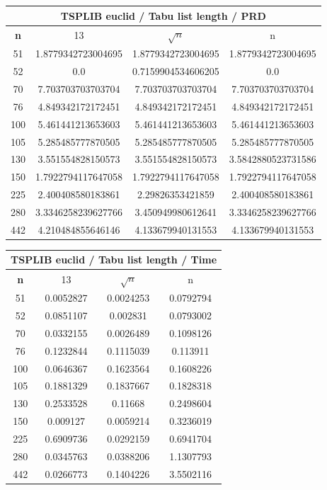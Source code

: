 \documentclass{article}
\begin{document}
\begin{center}
\begin{tabular}{|c|c|c|c|}
\hline
\multicolumn{4}{|c|}{\textbf{TSPLIB euclid / Tabu list length / PRD}}\\
\hline
\textbf{n} & 13 & $\sqrt{n}$ & n\\
\hline
51 & 1.8779342723004695 & 1.8779342723004695 & 1.8779342723004695\\
\hline
52 & 0.0 & 0.7159904534606205 & 0.0\\
\hline
70 & 7.703703703703704 & 7.703703703703704 & 7.703703703703704\\
\hline
76 & 4.849342172172451 & 4.849342172172451 & 4.849342172172451\\
\hline
100 & 5.461441213653603 & 5.461441213653603 & 5.461441213653603\\
\hline
105 & 5.285485777870505 & 5.285485777870505 & 5.285485777870505\\
\hline
130 & 3.551554828150573 & 3.551554828150573 & 3.5842880523731586\\
\hline
150 & 1.7922794117647058 & 1.7922794117647058 & 1.7922794117647058\\
\hline
225 & 2.400408580183861 & 2.29826353421859 & 2.400408580183861\\
\hline
280 & 3.3346258239627766 & 3.450949980612641 & 3.3346258239627766\\
\hline
442 & 4.210484855646146 & 4.133679940131553 & 4.133679940131553\\
\hline
\end{tabular}
\end{center}


\begin{center}
\begin{tabular}{|c|c|c|c|}
\hline
\multicolumn{4}{|c|}{\textbf{TSPLIB euclid / Tabu list length / Time}}\\
\hline
\textbf{n} & 13 & $\sqrt{n}$ & n\\
\hline
51 & 0.0052827 & 0.0024253 & 0.0792794\\
\hline
52 & 0.0851107 & 0.002831 & 0.0793002\\
\hline
70 & 0.0332155 & 0.0026489 & 0.1098126\\
\hline
76 & 0.1232844 & 0.1115039 & 0.113911\\
\hline
100 & 0.0646367 & 0.1623564 & 0.1608226\\
\hline
105 & 0.1881329 & 0.1837667 & 0.1828318\\
\hline
130 & 0.2533528 & 0.11668 & 0.2498604\\
\hline
150 & 0.009127 & 0.0059214 & 0.3236019\\
\hline
225 & 0.6909736 & 0.0292159 & 0.6941704\\
\hline
280 & 0.0345763 & 0.0388206 & 1.1307793\\
\hline
442 & 0.0266773 & 0.1404226 & 3.5502116\\
\hline
\end{tabular}
\end{center}
\end{document}
